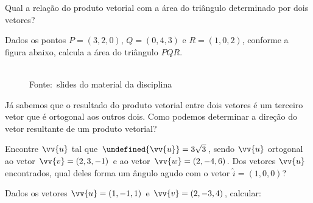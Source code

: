 \documentclass[pdftex, brazil, 12pt, oneside, addpoints]{exam}
\newcommand{\duaslinhas}{\fillwithlines{0.50in}}
\newcommand{\treslinhas}{\fillwithlines{0.75in}}
\newcommand{\vetor}[1]{\ensuremath{\vv{#1}}}
\newcommand{\vetori}{\ensuremath{\hat{i}}}
\let\norm\undefined %
\DeclarePairedDelimiter\norm{\lVert}{\rVert}
\begin{document}
\begin{questions}
\question
Qual a relação do produto vetorial com a área do triângulo determinado
por dois vetores?
\duaslinhas

\question
Dados os pontos $P = (3, 2, 0)$, $Q = (0, 4, 3)$ e $R = (1, 0, 2)$,
conforme a figura abaixo, calcula a área do triângulo $PQR$.
\begin{figure}[H]
  \begin{center}
    \\
    \footnotesize{Fonte:~slides do material da disciplina}
  \end{center}
\end{figure}

\question
Já sabemos que o resultado do produto vetorial entre dois vetores é um
terceiro vetor que é ortogonal aos outros dois. Como podemos
determinar a direção do vetor resultante de um produto vetorial?
\treslinhas

\question
Encontre \vetor{u} tal que $\norm{\vetor{u}} = 3\sqrt{3}$, sendo
\vetor{u} ortogonal ao vetor $\vetor{v} = (2, 3, -1)$ e ao vetor $\vetor{w} =
(2, -4, 6)$. Dos vetores \vetor{u} encontrados, qual deles forma um ângulo
agudo com o vetor $\vetori = (1, 0, 0)$?

\question
Dados os vetores $\vetor{u} = (1, -1, 1)$ e $\vetor{v} = (2, -3, 4)$,
calcular:
\end{questions}
\end{document}

